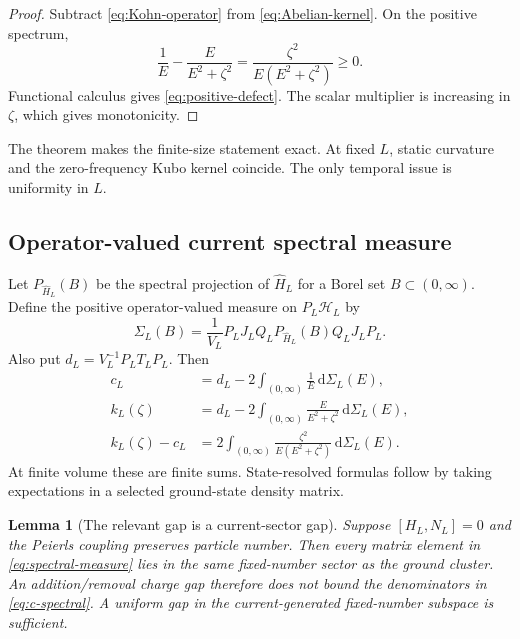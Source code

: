 \documentclass[11pt]{article}
\newtheorem{lemma}[theorem]{Lemma}
\theoremstyle{definition}
\theoremstyle{remark}
\newcommand{\cH}{\mathcal H}
\newcommand{\dd}{\mathrm d}
\begin{document}
\begin{proof}
Subtract \eqref{eq:Kohn-operator} from \eqref{eq:Abelian-kernel}.  On the positive spectrum,
\begin{equation}
 \frac1E-\frac{E}{E^2+\zeta^2}
 =\frac{\zeta^2}{E(E^2+\zeta^2)}\ge0.
\end{equation}
Functional calculus gives \eqref{eq:positive-defect}.  The scalar multiplier is increasing in $\zeta$,
which gives monotonicity.
\end{proof}

The theorem makes the finite-size statement exact.  At fixed $L$, static curvature and the
zero-frequency Kubo kernel coincide.  The only temporal issue is uniformity in $L$.

\subsection{Operator-valued current spectral measure}

Let $P_{\widehat H_L}(B)$ be the spectral projection of $\widehat H_L$ for a Borel set
$B\subset(0,\infty)$.  Define the positive operator-valued measure on $P_L\cH_L$ by
\begin{equation}
 \Sigma_L(B)
 =\frac1{V_L}P_LJ_LQ_LP_{\widehat H_L}(B)Q_LJ_LP_L.
 \label{eq:spectral-measure}
\end{equation}
Also put $d_L=V_L^{-1}P_LT_LP_L$.  Then
\begin{align}
 c_L&=d_L-2\int_{(0,\infty)}\frac1E\,\dd\Sigma_L(E),
 \label{eq:c-spectral}\\
 k_L(\zeta)&=d_L-2\int_{(0,\infty)}\frac{E}{E^2+\zeta^2}\,\dd\Sigma_L(E),
 \label{eq:k-spectral}\\
 k_L(\zeta)-c_L
 &=2\int_{(0,\infty)}\frac{\zeta^2}{E(E^2+\zeta^2)}\,\dd\Sigma_L(E).
 \label{eq:defect-spectral}
\end{align}
At finite volume these are finite sums.  State-resolved formulas follow by taking expectations in a
selected ground-state density matrix.

\begin{lemma}[The relevant gap is a current-sector gap]
\label{lem:charge-gap}
Suppose $[H_L,N_L]=0$ and the Peierls coupling preserves particle number.  Then every matrix element in
\eqref{eq:spectral-measure} lies in the same fixed-number sector as the ground cluster.  An
addition/removal charge gap therefore does not bound the denominators in \eqref{eq:c-spectral}.  A
uniform gap in the current-generated fixed-number subspace is sufficient.
\end{lemma}
\end{document}
